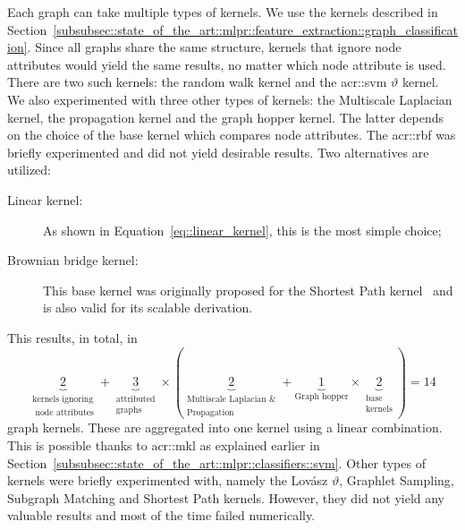        Each graph can take multiple types of kernels.
        We use the kernels described in Section~\ref{subsubsec::state_of_the_art::mlpr::feature_extraction::graph_classification}.
        Since all graphs share the same structure, kernels that ignore node attributes would yield the same results, no matter which node attribute is used.
        There are two such kernels: the random walk kernel and the \gls{acr::svm} \(\vartheta\) kernel.
        We also experimented with three other types of kernels: the Multiscale Laplacian kernel, the propagation kernel and the graph hopper kernel.
        The latter depends on the choice of the base kernel which compares node attributes.
        The \gls{acr::rbf} was briefly experimented and did not yield desirable results.
        Two alternatives are utilized:
        \begin{description}
            \item[Linear kernel:] As shown in Equation~\ref{eq::linear_kernel}, this is the most simple choice;
            \item[Brownian bridge kernel:] This base kernel was originally proposed for the Shortest Path kernel~\parencite{borgwardt2005shortest} and is also valid for its scalable derivation.
        \end{description}
        This results, in total, in \begin{equation*}
            \underbrace{2}_{\substack{\text{kernels ignoring}\\\text{ node attributes}}} + \underbrace{3}_{\substack{\text{attributed}\\\text{graphs}}} \times \left(\underbrace{2}_{\substack{\text{Multiscale Laplacian \&}\\\text{Propagation}}} + \underbrace{1}_{\text{Graph hopper}} \times \underbrace{2}_{\substack{\text{base}\\\text{kernels}}}\right) = 14
        \end{equation*} graph kernels.
        These are aggregated into one kernel using a linear combination.
        This is possible thanks to \acrfull{acr::mkl} as explained earlier in Section~\ref{subsubsec::state_of_the_art::mlpr::classifiers::svm}.
        Other types of kernels were briefly experimented with, namely the Lov\'asz \(\vartheta\), Graphlet Sampling, Subgraph Matching and Shortest Path kernels.
        However, they did not yield any valuable results and most of the time failed numerically.
        
